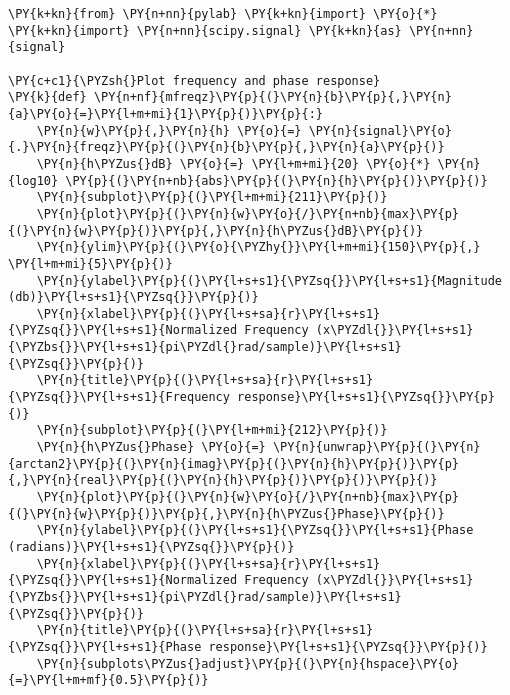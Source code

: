 \documentclass[a4paper,11pt,final]{article}
\begin{document}
\begin{Verbatim}[commandchars=\\\{\},frame=single,fontsize=\small, xleftmargin=0.5em]
\PY{k+kn}{from} \PY{n+nn}{pylab} \PY{k+kn}{import} \PY{o}{*}
\PY{k+kn}{import} \PY{n+nn}{scipy.signal} \PY{k+kn}{as} \PY{n+nn}{signal}
    
\PY{c+c1}{\PYZsh{}Plot frequency and phase response}
\PY{k}{def} \PY{n+nf}{mfreqz}\PY{p}{(}\PY{n}{b}\PY{p}{,}\PY{n}{a}\PY{o}{=}\PY{l+m+mi}{1}\PY{p}{)}\PY{p}{:}
    \PY{n}{w}\PY{p}{,}\PY{n}{h} \PY{o}{=} \PY{n}{signal}\PY{o}{.}\PY{n}{freqz}\PY{p}{(}\PY{n}{b}\PY{p}{,}\PY{n}{a}\PY{p}{)}
    \PY{n}{h\PYZus{}dB} \PY{o}{=} \PY{l+m+mi}{20} \PY{o}{*} \PY{n}{log10} \PY{p}{(}\PY{n+nb}{abs}\PY{p}{(}\PY{n}{h}\PY{p}{)}\PY{p}{)}
    \PY{n}{subplot}\PY{p}{(}\PY{l+m+mi}{211}\PY{p}{)}
    \PY{n}{plot}\PY{p}{(}\PY{n}{w}\PY{o}{/}\PY{n+nb}{max}\PY{p}{(}\PY{n}{w}\PY{p}{)}\PY{p}{,}\PY{n}{h\PYZus{}dB}\PY{p}{)}
    \PY{n}{ylim}\PY{p}{(}\PY{o}{\PYZhy{}}\PY{l+m+mi}{150}\PY{p}{,} \PY{l+m+mi}{5}\PY{p}{)}
    \PY{n}{ylabel}\PY{p}{(}\PY{l+s+s1}{\PYZsq{}}\PY{l+s+s1}{Magnitude (db)}\PY{l+s+s1}{\PYZsq{}}\PY{p}{)}
    \PY{n}{xlabel}\PY{p}{(}\PY{l+s+sa}{r}\PY{l+s+s1}{\PYZsq{}}\PY{l+s+s1}{Normalized Frequency (x\PYZdl{}}\PY{l+s+s1}{\PYZbs{}}\PY{l+s+s1}{pi\PYZdl{}rad/sample)}\PY{l+s+s1}{\PYZsq{}}\PY{p}{)}
    \PY{n}{title}\PY{p}{(}\PY{l+s+sa}{r}\PY{l+s+s1}{\PYZsq{}}\PY{l+s+s1}{Frequency response}\PY{l+s+s1}{\PYZsq{}}\PY{p}{)}
    \PY{n}{subplot}\PY{p}{(}\PY{l+m+mi}{212}\PY{p}{)}
    \PY{n}{h\PYZus{}Phase} \PY{o}{=} \PY{n}{unwrap}\PY{p}{(}\PY{n}{arctan2}\PY{p}{(}\PY{n}{imag}\PY{p}{(}\PY{n}{h}\PY{p}{)}\PY{p}{,}\PY{n}{real}\PY{p}{(}\PY{n}{h}\PY{p}{)}\PY{p}{)}\PY{p}{)}
    \PY{n}{plot}\PY{p}{(}\PY{n}{w}\PY{o}{/}\PY{n+nb}{max}\PY{p}{(}\PY{n}{w}\PY{p}{)}\PY{p}{,}\PY{n}{h\PYZus{}Phase}\PY{p}{)}
    \PY{n}{ylabel}\PY{p}{(}\PY{l+s+s1}{\PYZsq{}}\PY{l+s+s1}{Phase (radians)}\PY{l+s+s1}{\PYZsq{}}\PY{p}{)}
    \PY{n}{xlabel}\PY{p}{(}\PY{l+s+sa}{r}\PY{l+s+s1}{\PYZsq{}}\PY{l+s+s1}{Normalized Frequency (x\PYZdl{}}\PY{l+s+s1}{\PYZbs{}}\PY{l+s+s1}{pi\PYZdl{}rad/sample)}\PY{l+s+s1}{\PYZsq{}}\PY{p}{)}
    \PY{n}{title}\PY{p}{(}\PY{l+s+sa}{r}\PY{l+s+s1}{\PYZsq{}}\PY{l+s+s1}{Phase response}\PY{l+s+s1}{\PYZsq{}}\PY{p}{)}
    \PY{n}{subplots\PYZus{}adjust}\PY{p}{(}\PY{n}{hspace}\PY{o}{=}\PY{l+m+mf}{0.5}\PY{p}{)}


\end{Verbatim}
\end{document}
